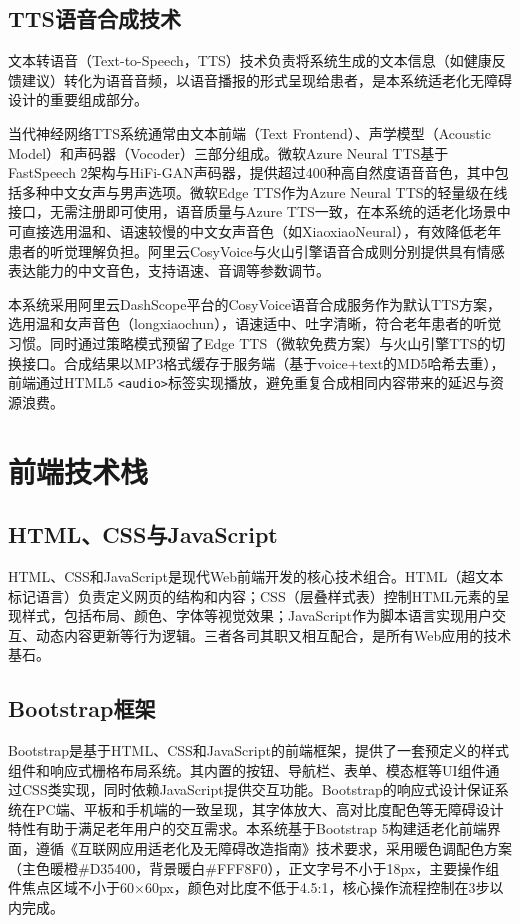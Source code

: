 \subsection{TTS语音合成技术}

文本转语音（Text-to-Speech，TTS）技术负责将系统生成的文本信息（如健康反馈建议）转化为语音音频，以语音播报的形式呈现给患者，是本系统适老化无障碍设计的重要组成部分。

当代神经网络TTS系统通常由文本前端（Text Frontend）、声学模型（Acoustic Model）和声码器（Vocoder）三部分组成。微软Azure Neural TTS基于FastSpeech 2架构与HiFi-GAN声码器，提供超过400种高自然度语音音色，其中包括多种中文女声与男声选项。微软Edge TTS作为Azure Neural TTS的轻量级在线接口，无需注册即可使用，语音质量与Azure TTS一致，在本系统的适老化场景中可直接选用温和、语速较慢的中文女声音色（如XiaoxiaoNeural），有效降低老年患者的听觉理解负担\todocite{}。阿里云CosyVoice与火山引擎语音合成则分别提供具有情感表达能力的中文音色，支持语速、音调等参数调节\todocite{}。

本系统采用阿里云DashScope平台的CosyVoice语音合成服务作为默认TTS方案，选用温和女声音色（longxiaochun），语速适中、吐字清晰，符合老年患者的听觉习惯。同时通过策略模式预留了Edge TTS（微软免费方案）与火山引擎TTS的切换接口。合成结果以MP3格式缓存于服务端（基于voice+text的MD5哈希去重），前端通过HTML5 \texttt{<audio>}标签实现播放，避免重复合成相同内容带来的延迟与资源浪费。

\section{前端技术栈}

\subsection{HTML、CSS与JavaScript}

HTML、CSS和JavaScript是现代Web前端开发的核心技术组合。HTML（超文本标记语言）负责定义网页的结构和内容；CSS（层叠样式表）控制HTML元素的呈现样式，包括布局、颜色、字体等视觉效果；JavaScript作为脚本语言实现用户交互、动态内容更新等行为逻辑。三者各司其职又相互配合，是所有Web应用的技术基石\todocite{}。

\subsection{Bootstrap框架}

Bootstrap是基于HTML、CSS和JavaScript的前端框架，提供了一套预定义的样式组件和响应式栅格布局系统。其内置的按钮、导航栏、表单、模态框等UI组件通过CSS类实现，同时依赖JavaScript提供交互功能\todocite{}。Bootstrap的响应式设计保证系统在PC端、平板和手机端的一致呈现，其字体放大、高对比度配色等无障碍设计特性有助于满足老年用户的交互需求。本系统基于Bootstrap 5构建适老化前端界面，遵循《互联网应用适老化及无障碍改造指南》技术要求，采用暖色调配色方案（主色暖橙\#D35400，背景暖白\#FFF8F0），正文字号不小于18px，主要操作组件焦点区域不小于60$\times$60px，颜色对比度不低于4.5:1，核心操作流程控制在3步以内完成\todocite{}。

